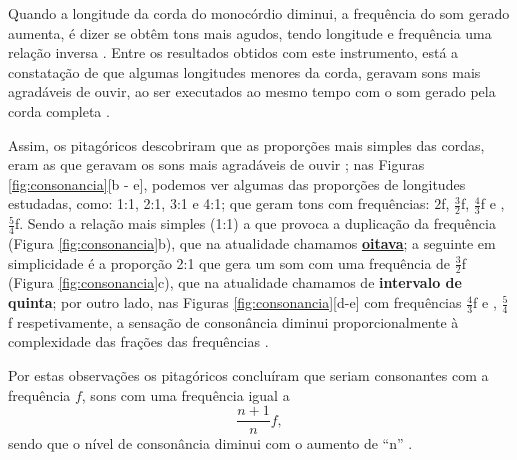 Quando a longitude da corda do monocórdio diminui, 
a frequência do som gerado aumenta, é dizer se obtêm tons mais agudos,
tendo longitude e frequência uma relação inversa \cite[pp. 12]{arbones2012armonia}. 
Entre os resultados obtidos com este instrumento, 
está a constatação de que algumas longitudes menores da corda, 
geravam sons mais agradáveis de ouvir, ao ser executados ao mesmo tempo com o som gerado pela corda completa \cite[pp. 12]{arbones2012armonia}.

Assim, os pitagóricos descobriram que as proporções mais simples das cordas,
eram as que geravam os sons mais agradáveis de ouvir \cite[pp. 12]{arbones2012armonia};
nas Figuras \ref{fig:consonancia}[b - e], podemos ver algumas das proporções de longitudes estudadas,
como: 1:1, 2:1, 3:1 e 4:1; que geram tons com frequências: 
$2$f, $\frac{3}{2}$f, $\frac{4}{3}$f e , $\frac{5}{4}$f.
Sendo a relação mais simples (1:1) a que provoca a duplicação da frequência (Figura \ref{fig:consonancia}b),
que na atualidade chamamos \hyperref[sec:pos:Oitava]{\textbf{oitava}}; 
a seguinte em simplicidade é a proporção 2:1 que gera um som com uma frequência de $\frac{3}{2}$f (Figura \ref{fig:consonancia}c),
que na atualidade chamamos de \textbf{intervalo de quinta};
por outro lado, nas Figuras \ref{fig:consonancia}[d-e] com frequências $\frac{4}{3}$f e , $\frac{5}{4}$f respetivamente,
a sensação de consonância diminui proporcionalmente à complexidade das frações das frequências \cite[pp. 12]{arbones2012armonia}.

Por estas observações os pitagóricos concluíram que seriam consonantes com a frequência $f$, sons com uma frequência igual a 
\begin{equation}
\label{eq:simplespita}
\frac{n+1}{n}f,
\end{equation}
sendo que o nível de consonância diminui com o aumento de ``n'' \cite[pp. 14]{arbones2012armonia}.

\label{ref:paginadiatonicanumerica}

